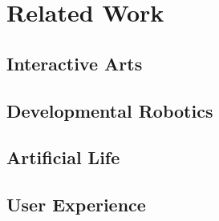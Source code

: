\chapter{Related Work}
\section{Interactive Arts}

\section{Developmental Robotics}

\section{Artificial Life}

\section{User Experience}
